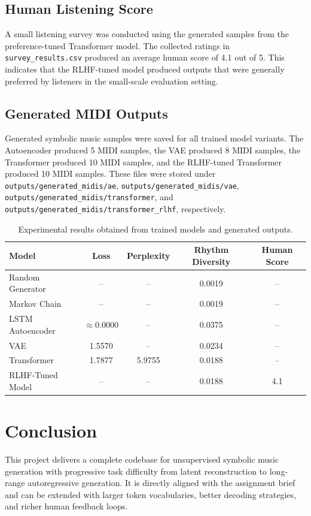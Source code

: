 \documentclass[11pt]{article}
\begin{document}
\subsection{Human Listening Score}
A small listening survey was conducted using the generated samples from the preference-tuned Transformer model. The collected ratings in \texttt{survey\_results.csv} produced an average human score of 4.1 out of 5. This indicates that the RLHF-tuned model produced outputs that were generally preferred by listeners in the small-scale evaluation setting.

\subsection{Generated MIDI Outputs}
Generated symbolic music samples were saved for all trained model variants. The Autoencoder produced 5 MIDI samples, the VAE produced 8 MIDI samples, the Transformer produced 10 MIDI samples, and the RLHF-tuned Transformer produced 10 MIDI samples. These files were stored under \texttt{outputs/generated\_midis/ae}, \texttt{outputs/generated\_midis/vae}, \texttt{outputs/generated\_midis/transformer}, and \texttt{outputs/generated\_midis/transformer\_rlhf}, respectively.

\begin{table}[h!]
\centering
\begin{tabular}{lcccc}
\toprule
Model & Loss & Perplexity & Rhythm Diversity & Human Score \\
\midrule
Random Generator & -- & -- & 0.0019 & -- \\
Markov Chain & -- & -- & 0.0019 & -- \\
LSTM Autoencoder & $\approx 0.0000$ & -- & 0.0375 & -- \\
VAE & 1.5570 & -- & 0.0234 & -- \\
Transformer & 1.7877 & 5.9755 & 0.0188 & -- \\
RLHF-Tuned Model & -- & -- & 0.0188 & 4.1 \\
\bottomrule
\end{tabular}
\caption{Experimental results obtained from trained models and generated outputs.}
\label{tab:final_results}
\end{table}

\section{Conclusion}
This project delivers a complete codebase for unsupervised symbolic music generation with progressive task difficulty from latent reconstruction to long-range autoregressive generation. It is directly aligned with the assignment brief and can be extended with larger token vocabularies, better decoding strategies, and richer human feedback loops.



\end{document}

